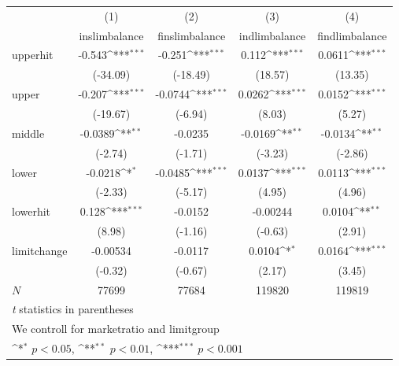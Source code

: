 {
\def\sym#1{\ifmmode^{#1}\else\(^{#1}\)\fi}
\begin{tabular}{l*{4}{c}}
\hline\hline
            &\multicolumn{1}{c}{(1)}&\multicolumn{1}{c}{(2)}&\multicolumn{1}{c}{(3)}&\multicolumn{1}{c}{(4)}\\
            &\multicolumn{1}{c}{inslimbalance}&\multicolumn{1}{c}{finslimbalance}&\multicolumn{1}{c}{indlimbalance}&\multicolumn{1}{c}{findlimbalance}\\
\hline
upperhit    &      -0.543\sym{***}&      -0.251\sym{***}&       0.112\sym{***}&      0.0611\sym{***}\\
            &    (-34.09)         &    (-18.49)         &     (18.57)         &     (13.35)         \\
[1em]
upper       &      -0.207\sym{***}&     -0.0744\sym{***}&      0.0262\sym{***}&      0.0152\sym{***}\\
            &    (-19.67)         &     (-6.94)         &      (8.03)         &      (5.27)         \\
[1em]
middle      &     -0.0389\sym{**} &     -0.0235         &     -0.0169\sym{**} &     -0.0134\sym{**} \\
            &     (-2.74)         &     (-1.71)         &     (-3.23)         &     (-2.86)         \\
[1em]
lower       &     -0.0218\sym{*}  &     -0.0485\sym{***}&      0.0137\sym{***}&      0.0113\sym{***}\\
            &     (-2.33)         &     (-5.17)         &      (4.95)         &      (4.96)         \\
[1em]
lowerhit    &       0.128\sym{***}&     -0.0152         &    -0.00244         &      0.0104\sym{**} \\
            &      (8.98)         &     (-1.16)         &     (-0.63)         &      (2.91)         \\
[1em]
limitchange &    -0.00534         &     -0.0117         &      0.0104\sym{*}  &      0.0164\sym{***}\\
            &     (-0.32)         &     (-0.67)         &      (2.17)         &      (3.45)         \\
\hline
\(N\)       &       77699         &       77684         &      119820         &      119819         \\
\hline\hline
\multicolumn{5}{l}{\footnotesize \textit{t} statistics in parentheses}\\
\multicolumn{5}{l}{\footnotesize We controll for marketratio and limitgroup}\\
\multicolumn{5}{l}{\footnotesize \sym{*} \(p<0.05\), \sym{**} \(p<0.01\), \sym{***} \(p<0.001\)}\\
\end{tabular}
}
